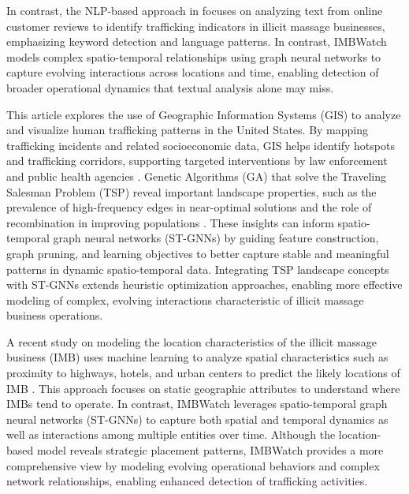 \documentclass[letterpaper]{article} %
\begin{document}
In contrast, the NLP-based approach in \cite{Li2023} focuses on analyzing text from online customer reviews to identify trafficking indicators in illicit massage businesses, emphasizing keyword detection and language patterns. In contrast, IMBWatch models complex spatio-temporal relationships using graph neural networks to capture evolving interactions across locations and time, enabling detection of broader operational dynamics that textual analysis alone may miss.

This article explores the use of Geographic Information Systems (GIS) to analyze and visualize human trafficking patterns in the United States. By mapping trafficking incidents and related socioeconomic data, GIS helps identify hotspots and trafficking corridors, supporting targeted interventions by law enforcement and public health agencies \cite{Chin2015}. Genetic Algorithms (GA) that solve the Traveling Salesman Problem (TSP) reveal important landscape properties, such as the prevalence of high-frequency edges in near-optimal solutions and the role of recombination in improving populations \cite{10.1145/3321707.3321772,10.1145/3449639.3459281,10.1145/3377930.3390145}. These insights can inform spatio-temporal graph neural networks (ST-GNNs) by guiding feature construction, graph pruning, and learning objectives to better capture stable and meaningful patterns in dynamic spatio-temporal data. Integrating TSP landscape concepts with ST-GNNs extends heuristic optimization approaches, enabling more effective modeling of complex, evolving interactions characteristic of illicit massage business operations.

A recent study on modeling the location characteristics of the illicit massage business (IMB) uses machine learning to analyze spatial characteristics such as proximity to highways, hotels, and urban centers to predict the likely locations of IMB \cite{White2021}. This approach focuses on static geographic attributes to understand where IMBs tend to operate. In contrast, IMBWatch leverages spatio-temporal graph neural networks (ST-GNNs) to capture both spatial and temporal dynamics as well as interactions among multiple entities over time. Although the location-based model reveals strategic placement patterns, IMBWatch provides a more comprehensive view by modeling evolving operational behaviors and complex network relationships, enabling enhanced detection of trafficking activities.
\end{document}
